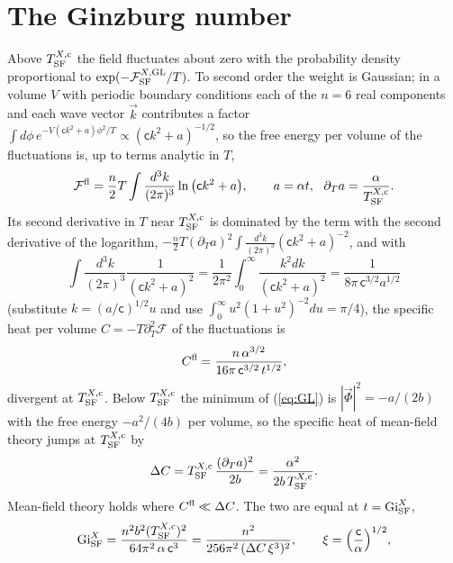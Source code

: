 \documentclass[aps,prd,onecolumn,superscriptaddress,nofootinbib,floatfix,longbibliography]{revtex4-2}
\newcommand{\SF}{{\rm SF}}
\begin{document}
\section{The Ginzburg number}
\label{sec:gi}

Above $T^{X,{\rm c}}_\SF$ the field fluctuates about zero with the probability density proportional to $\exp(-\mathcal F^{X,{\rm GL}}_\SF/T)$. To
second order the weight is Gaussian; in a volume $V$ with periodic boundary conditions each of the $n=6$ real components and each
wave vector $\vec k$ contributes a factor $\int d\phi\,e^{-V(\mathsf ck^2+a)\phi^2/T}\propto(\mathsf ck^2+a)^{-1/2}$, so the free energy per volume
of the fluctuations is, up to terms analytic in $T$,
\begin{equation}
\mathcal F^{\rm fl}=\frac n2T\int\frac{d^3k}{(2\pi)^3}\ln\big(\mathsf ck^2+a\big),\qquad a=\alpha t,\ \ \partial_Ta=\frac{\alpha}{T^{X,{\rm c}}_\SF}.
\label{eq:Ffl}
\end{equation}
Its second derivative in $T$ near $T^{X,{\rm c}}_\SF$ is dominated by the term with the second derivative of the logarithm,
$-\frac n2T(\partial_Ta)^2\int\frac{d^3k}{(2\pi)^3}(\mathsf ck^2+a)^{-2}$, and with
\begin{equation}
\int\frac{d^3k}{(2\pi)^3}\frac1{(\mathsf ck^2+a)^2}=\frac1{2\pi^2}\int_0^\infty\frac{k^2dk}{(\mathsf ck^2+a)^2}=\frac{1}{8\pi\,\mathsf c^{3/2}a^{1/2}}
\label{eq:integral}
\end{equation}
(substitute $k=(a/\mathsf c)^{1/2}u$ and use $\int_0^\infty u^2(1+u^2)^{-2}du=\pi/4$), the specific heat per volume
$C=-T\partial_T^2\mathcal F$ of the fluctuations is
\begin{equation}
C^{\rm fl}=\frac{n\,\alpha^{3/2}}{16\pi\,\mathsf c^{3/2}\,t^{1/2}},
\label{eq:Cfl}
\end{equation}
divergent at $T^{X,{\rm c}}_\SF$. Below $T^{X,{\rm c}}_\SF$ the minimum of (\ref{eq:GL}) is $|\vec\Phi|^2=-a/(2b)$ with the free energy $-a^2/(4b)$ per
volume, so the specific heat of mean-field theory jumps at $T^{X,{\rm c}}_\SF$ by
\begin{equation}
\Delta C=T^{X,{\rm c}}_\SF\,\frac{(\partial_Ta)^2}{2b}=\frac{\alpha^2}{2b\,T^{X,{\rm c}}_\SF}.
\label{eq:DC}
\end{equation}
Mean-field theory holds where $C^{\rm fl}\ll\Delta C$. The two are equal at $t={\rm Gi}^X_\SF$,
\begin{equation}
{\rm Gi}^X_\SF=\frac{n^2b^2(T^{X,{\rm c}}_\SF)^2}{64\pi^2\,\alpha\,\mathsf c^3}=\frac{n^2}{256\pi^2\,(\Delta C\,\xi^3)^2},\qquad\xi=\Big(\frac{\mathsf c}{\alpha}\Big)^{1/2},
\label{eq:Gi}
\end{equation}
\end{document}
